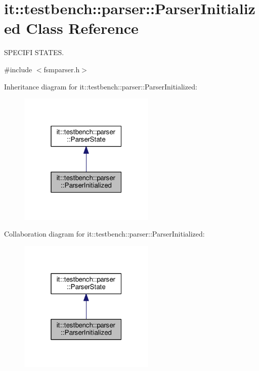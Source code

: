\hypertarget{classit_1_1testbench_1_1parser_1_1ParserInitialized}{\section{it\-:\-:testbench\-:\-:parser\-:\-:Parser\-Initialized Class Reference}
\label{d2/d1e/classit_1_1testbench_1_1parser_1_1ParserInitialized}
}


S\-P\-E\-C\-I\-F\-I S\-T\-A\-T\-E\-S.  




{\ttfamily \#include $<$fsmparser.\-h$>$}



Inheritance diagram for it\-:\-:testbench\-:\-:parser\-:\-:Parser\-Initialized\-:
\nopagebreak
\begin{figure}[H]
\begin{center}
\leavevmode
\includegraphics[width=184pt]{db/d2d/classit_1_1testbench_1_1parser_1_1ParserInitialized__inherit__graph}
\end{center}
\end{figure}


Collaboration diagram for it\-:\-:testbench\-:\-:parser\-:\-:Parser\-Initialized\-:
\nopagebreak
\begin{figure}[H]
\begin{center}
\leavevmode
\includegraphics[width=184pt]{d0/d0e/classit_1_1testbench_1_1parser_1_1ParserInitialized__coll__graph}
\end{center}
\end{figure}
